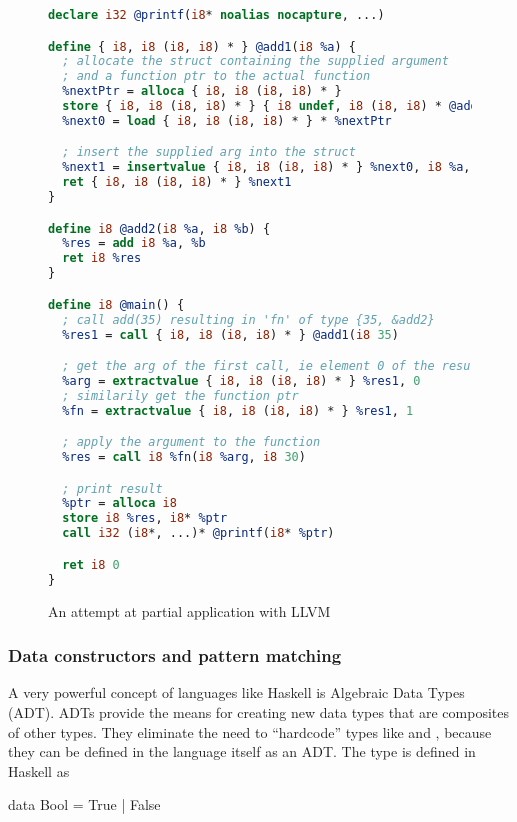 \begin{figure}[p]
\begin{lstlisting}[language=llvm]
declare i32 @printf(i8* noalias nocapture, ...)

define { i8, i8 (i8, i8) * } @add1(i8 %a) {
  ; allocate the struct containing the supplied argument
  ; and a function ptr to the actual function
  %nextPtr = alloca { i8, i8 (i8, i8) * }
  store { i8, i8 (i8, i8) * } { i8 undef, i8 (i8, i8) * @add2 }, { i8, i8 (i8, i8) * } * %nextPtr
  %next0 = load { i8, i8 (i8, i8) * } * %nextPtr

  ; insert the supplied arg into the struct
  %next1 = insertvalue { i8, i8 (i8, i8) * } %next0, i8 %a, 0
  ret { i8, i8 (i8, i8) * } %next1
}

define i8 @add2(i8 %a, i8 %b) {
  %res = add i8 %a, %b
  ret i8 %res
}

define i8 @main() {
  ; call add(35) resulting in 'fn' of type {35, &add2}
  %res1 = call { i8, i8 (i8, i8) * } @add1(i8 35)

  ; get the arg of the first call, ie element 0 of the resulting struct
  %arg = extractvalue { i8, i8 (i8, i8) * } %res1, 0
  ; similarily get the function ptr
  %fn = extractvalue { i8, i8 (i8, i8) * } %res1, 1

  ; apply the argument to the function
  %res = call i8 %fn(i8 %arg, i8 30)

  ; print result
  %ptr = alloca i8
  store i8 %res, i8* %ptr
  call i32 (i8*, ...)* @printf(i8* %ptr)

  ret i8 0
}
\end{lstlisting}
\caption{An attempt at partial application with LLVM}
\label{fig:llvm-partial}
\end{figure}


\subsubsection{Data constructors and pattern matching}
A very powerful concept of languages like Haskell is Algebraic Data Types (ADT). ADTs provide the means for creating new data types that are composites of other types. They eliminate the need to ``hardcode'' types like  and , because they can be defined in the language itself as an ADT. The  type is defined in Haskell as

\begin{haskell}
data Bool = True | False
\end{haskell}

